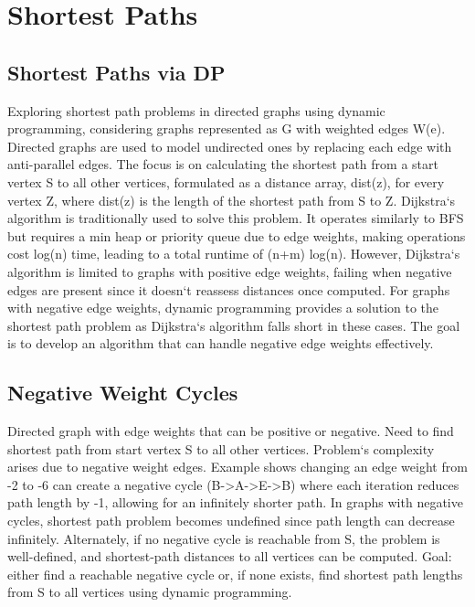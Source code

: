 \section*{Shortest Paths}

\subsection*{Shortest Paths via DP}
Exploring shortest path problems in directed graphs using dynamic programming, considering graphs represented as G with weighted edges W(e).
Directed graphs are used to model undirected ones by replacing each edge with anti-parallel edges.
The focus is on calculating the shortest path from a start vertex S to all other vertices, formulated as a distance array, dist(z), for every vertex Z, where dist(z) is the length of the shortest path from S to Z\@.
Dijkstra`s algorithm is traditionally used to solve this problem.
It operates similarly to BFS but requires a min heap or priority queue due to edge weights, making operations cost log(n) time, leading to a total runtime of (n+m) log(n).
However, Dijkstra`s algorithm is limited to graphs with positive edge weights, failing when negative edges are present since it doesn`t reassess distances once computed.
For graphs with negative edge weights, dynamic programming provides a solution to the shortest path problem as Dijkstra`s algorithm falls short in these cases.
The goal is to develop an algorithm that can handle negative edge weights effectively.

\subsection*{Negative Weight Cycles}
Directed graph with edge weights that can be positive or negative.
Need to find shortest path from start vertex S to all other vertices.
Problem`s complexity arises due to negative weight edges.
Example shows changing an edge weight from -2 to -6 can create a negative cycle (B-\textgreater{}A-\textgreater{}E-\textgreater{}B) where each iteration reduces path length by -1, allowing for an infinitely shorter path.
In graphs with negative cycles, shortest path problem becomes undefined since path length can decrease infinitely.
Alternately, if no negative cycle is reachable from S, the problem is well-defined, and shortest-path distances to all vertices can be computed.
Goal: either find a reachable negative cycle or, if none exists, find shortest path lengths from S to all vertices using dynamic programming.

